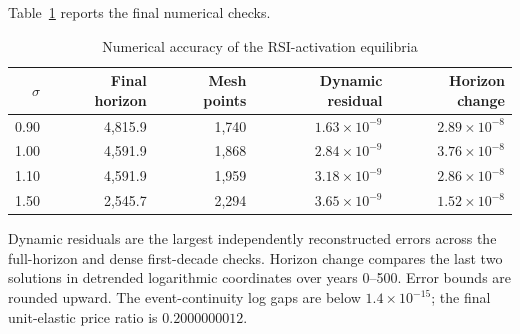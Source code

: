 Table~\ref{tab:rewrite-rsi-accuracy} reports the final numerical checks.
\begin{table}[H]
 \centering
 \caption{Numerical accuracy of the RSI-activation equilibria}
 \label{tab:rewrite-rsi-accuracy}
 \small
 \begin{tabular}{rrrrr}
 \toprule
 $\sigma$ & Final horizon & Mesh points & Dynamic residual & Horizon change\\
 \midrule
 0.90 & 4,815.9 & 1,740 & $1.63\times10^{-9}$ & $2.89\times10^{-8}$\\
 1.00 & 4,591.9 & 1,868 & $2.84\times10^{-9}$ & $3.76\times10^{-8}$\\
 1.10 & 4,591.9 & 1,959 & $3.18\times10^{-9}$ & $2.86\times10^{-8}$\\
 1.50 & 2,545.7 & 2,294 & $3.65\times10^{-9}$ & $1.52\times10^{-8}$\\
 \bottomrule
 \end{tabular}
 \par\smallskip
 \begin{minipage}{0.95\textwidth}\footnotesize
 Dynamic residuals are the largest independently reconstructed errors
 across the full-horizon and dense first-decade checks. Horizon change
 compares the last two solutions in detrended logarithmic coordinates
 over years 0--500. Error bounds are rounded upward. The event-continuity
 log gaps are below $1.4\times10^{-15}$; the final unit-elastic price ratio
 is $0.2000000012$.
 \end{minipage}
\end{table}

